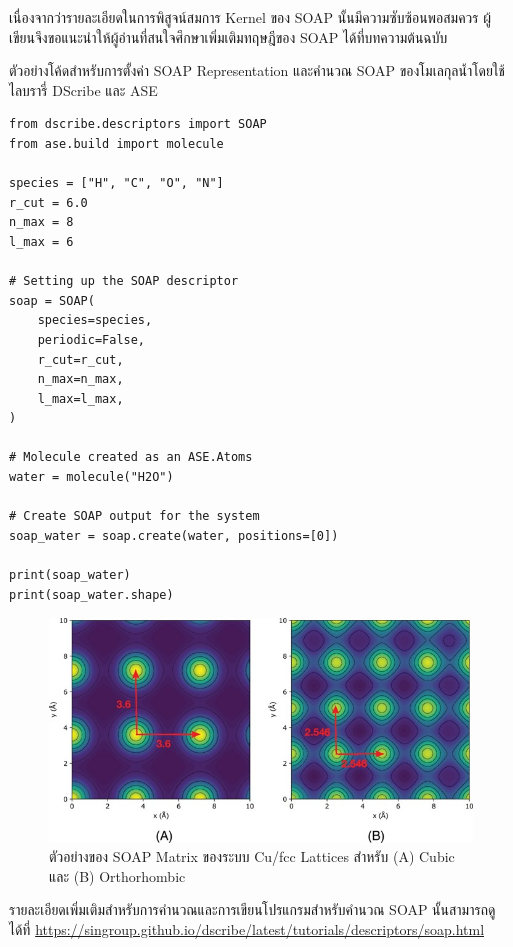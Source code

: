 เนื่องจากว่ารายละเอียดในการพิสูจน์สมการ Kernel ของ SOAP นั้นมีความซับซ้อนพอสมควร ผู้เขียนจึงขอแนะนำให้ผู้อ่านที่สนใจศึกษาเพิ่มเติมทฤษฎีของ
SOAP ได้ที่บทความต้นฉบับ\autocite{bartok2013}

ตัวอย่างโค้ดสำหรับการตั้งค่า SOAP Representation และคำนวณ SOAP ของโมเลกุลน้ำโดยใช้ไลบรารี่ DScribe และ ASE

\begin{lstlisting}[style=MyPython]
from dscribe.descriptors import SOAP
from ase.build import molecule

species = ["H", "C", "O", "N"]
r_cut = 6.0
n_max = 8
l_max = 6

# Setting up the SOAP descriptor
soap = SOAP(
    species=species,
    periodic=False,
    r_cut=r_cut,
    n_max=n_max,
    l_max=l_max,
)

# Molecule created as an ASE.Atoms
water = molecule("H2O")

# Create SOAP output for the system
soap_water = soap.create(water, positions=[0])

print(soap_water)
print(soap_water.shape)
\end{lstlisting}

\vspace{1em}

\begin{figure}[htbp]
    \centering
    \includegraphics[width=\linewidth]{fig/soap_matrix.jpg}
    \caption{ตัวอย่างของ SOAP Matrix ของระบบ Cu/fcc Lattices สำหรับ (A) Cubic และ (B) Orthorhombic}
    \label{fig:soap_matrix}
\end{figure}

\vspace{1em}

รายละเอียดเพิ่มเติมสำหรับการคำนวณและการเขียนโปรแกรมสำหรับคำนวณ SOAP นั้นสามารถดูได้ที่
\url{https://singroup.github.io/dscribe/latest/tutorials/descriptors/soap.html}

